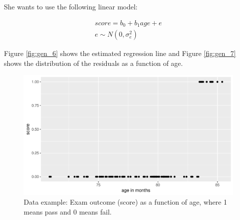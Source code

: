 \documentclass[]{report}\usepackage[]{graphicx}\usepackage[]{color}
\makeatletter
\def\maxwidth{ %
  \ifdim\Gin@nat@width>\linewidth
    \linewidth
  \else
    \Gin@nat@width
  \fi
}
\newenvironment{knitrout}{}{} %
\makeatother
\begin{document}
She wants to use the following linear model:

\begin{eqnarray}
score = b_0 + b_1 age  + e \\
e \sim N(0, \sigma_e^2)
\end{eqnarray}

Figure \ref{fig:gen_6} shows the estimated regression line and Figure \ref{fig:gen_7} shows the distribution of the residuals as a function of age.


\begin{knitrout}
\color{fgcolor}\begin{figure}

{\centering \includegraphics[width=\maxwidth]{figure/gen_5-1} 

}

\caption[Data example]{Data example: Exam outcome (score) as a function of age, where 1 means pass and 0 means fail.}\label{fig:gen_5}
\end{figure}


\end{knitrout}
\end{document}
